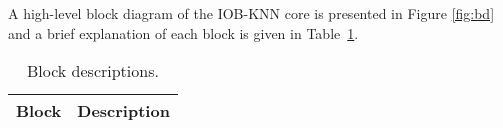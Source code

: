 
A high-level block diagram of the IOB-KNN core is presented in
Figure \ref{fig:bd} and a brief explanation of each block is given in
Table~\ref{tab:blocks}.



\begin{table}[H]
  \centering
    \begin{tabularx}{\textwidth}{ | c | X | }
    \hline
    \rowcolor{iob-green}
    {\bf Block} & {\bf Description} \\ \hline

    

    \end{tabularx}
  \caption{Block descriptions.}
  \label{tab:blocks}
\end{table}
